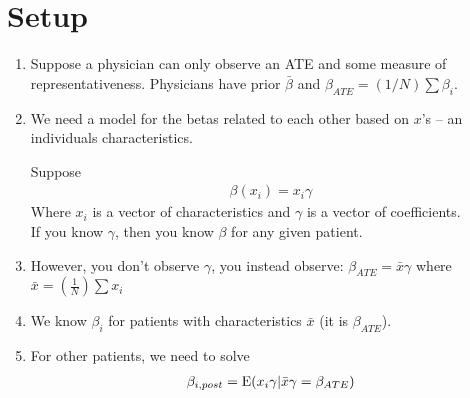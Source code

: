 \section{Setup}


\begin{enumerate}

	\item  Suppose a physician can only observe an ATE and some measure of representativeness. Physicians have prior
		$\bar{\beta}$ and  $\beta_{ATE} = (1/N) \sum \beta_{i}$.

	\item We need a model for the betas related to each other based on $x$'s -- an individuals characteristics.

		Suppose
		\begin{align*}
			\beta(x_i) = x_i \gamma
		\end{align*} 
		Where $x_i$ is a vector of characteristics and $\gamma$ is a vector of coefficients. \\
		If you know $\gamma$, then you know $\beta$ for any given patient.
	\item However, you don't observe $\gamma$, you instead observe:
		$\beta_{ATE} = \bar x \gamma$ where $\bar x = (\frac{1}{N}) \sum x_i$
	\item We know $\beta_i$ for patients with characteristics $\bar x$ (it is $\beta_{ATE}$).
	\item For other patients, we need to solve
		\begin{align*}
			\beta_{i,post} = \mathrm{E}(x_i \gamma | \bar x \gamma = \beta_{ATE})
		\end{align*} 


\end{enumerate}
